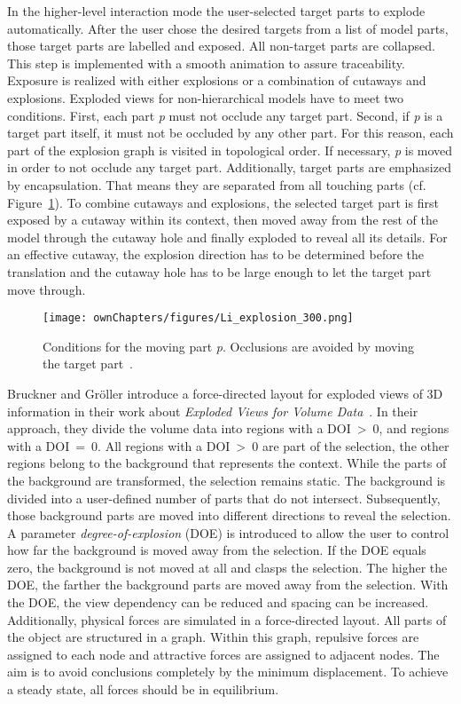 In the higher-level interaction mode the user-selected target parts to explode automatically. After the user chose the desired targets from a list of model parts, those target parts are labelled and exposed. All non-target parts are collapsed. This step is implemented with a smooth animation to assure traceability. Exposure is realized with either explosions or a combination of cutaways and explosions. Exploded views for non-hierarchical models have to meet two conditions. First, each part \emph{p} must not occlude any target part. Second, if \emph{p} is a target part itself, it must not be occluded by any other part. For this reason, each part of the explosion graph is visited in topological order. If necessary, \emph{p} is moved in order to not occlude any target part. Additionally, target parts are emphasized by encapsulation. That means they are separated from all touching parts (cf. Figure~\ref{fig:liExplosion}). To combine cutaways and explosions, the selected target part is first exposed by a cutaway within its context, then moved away from the rest of the model through the cutaway hole and finally exploded to reveal all its details. For an effective cutaway, the explosion direction has to be determined before the translation and the cutaway hole has to be large enough to let the target part move through.
\begin{figure}
\centering
\texttt{[image: ownChapters/figures/Li\_explosion\_300.png]}
\caption{Conditions for the moving part \emph{p}. Occlusions are avoided by moving the target part~\cite{jour:generationExplodedView}.}%
\label{fig:liExplosion}%
\end{figure}

Bruckner and Gr{\"o}ller introduce a force-directed layout for exploded views of 3D information in their work about \emph{Exploded Views for Volume Data}~\cite{jour:explodedView}. In their approach, they divide the volume data into regions with a DOI~>~0, and regions with a DOI~=~0. All regions with a DOI~>~0 are part of the selection, the other regions belong to the background that represents the context. While the parts of the background are transformed, the selection remains static. The background is divided into a user-defined number of parts that do not intersect. Subsequently, those background parts are moved into different directions to reveal the selection. A parameter \emph{degree-of-explosion} (DOE) is introduced to allow the user to control how far the background is moved away from the selection. If the DOE equals zero, the background is not moved at all and clasps the selection. The higher the DOE, the farther the background parts are moved away from the selection. With the DOE, the view dependency can be reduced and spacing can be increased. Additionally, physical forces are simulated in a force-directed layout. All parts of the object are structured in a graph. Within this graph, repulsive forces are assigned to each node and attractive forces are assigned to adjacent nodes. The aim is to avoid conclusions completely by the minimum displacement. To achieve a steady state, all forces should be in equilibrium.

